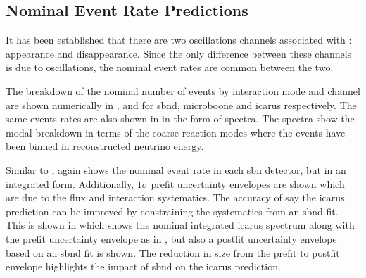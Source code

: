 \subsection{Nominal Event Rate Predictions}

It has been established that there are two oscillations channels associated with \nue: \nue appearance and \nue disappearance. Since the only difference between these channels is due to oscillations, the nominal event rates are common between the two.

The breakdown of the nominal number of events by interaction mode and channel are shown numerically in ,  and  for \gls{sbnd}, \gls{microboone} and \gls{icarus} respectively. The same events rates are also shown in  in the form of spectra. The spectra show the modal breakdown in terms of the coarse reaction modes where the events have been binned in reconstructed neutrino energy. 

Similar to ,  again shows the nominal event rate in each \gls{sbn} detector, but in an integrated form. Additionally, $1\sigma$ prefit uncertainty envelopes are shown which are due to the flux and interaction systematics. The accuracy of say the \gls{icarus} prediction can be improved by constraining the systematics from an \gls{sbnd} fit. This is shown in  which shows the nominal integrated \gls{icarus} spectrum along with the prefit uncertainty envelope as in , but also a postfit uncertainty envelope based on an \gls{sbnd} fit is shown. The reduction in size from the prefit to postfit envelope highlights the impact of \gls{sbnd} on the \gls{icarus} prediction. 

